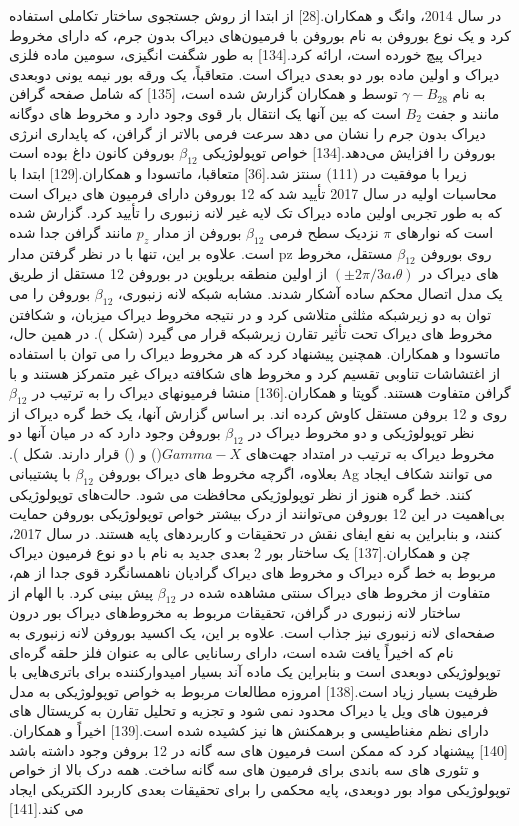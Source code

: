در سال 2014، وانگ و همکاران.[28] از ابتدا از روش جستجوی ساختار تکاملی استفاده کرد و یک نوع بوروفن به نام  بوروفن با فرمیون‌های دیراک بدون جرم، که دارای مخروط دیراک پیچ خورده است، ارائه کرد.[134] به طور شگفت انگیزی،  سومین ماده فلزی دیراک و اولین ماده بور دو بعدی دیراک است. متعاقباً، یک ورقه بور نیمه یونی دوبعدی به نام $\gamma-B_28$ توسط  و همکاران گزارش شده است، [135] که شامل صفحه گرافن مانند و جفت $B_2$ است که بین آنها یک انتقال بار قوی وجود دارد و مخروط های دوگانه دیراک بدون جرم را نشان می دهد سرعت فرمی بالاتر از گرافن، که پایداری انرژی بوروفن  را افزایش می‌دهد.[134] خواص توپولوژیکی $\beta_{12}$ بوروفن کانون داغ بوده است زیرا با موفقیت در  (111) سنتز شد.[36] متعاقبا، ماتسودا و همکاران.[129] ابتدا با محاسبات اولیه در سال 2017 تأیید شد که 12 بوروفن دارای فرمیون های دیراک است که به طور تجربی اولین ماده دیراک تک لایه غیر لانه زنبوری را تأیید کرد. گزارش شده است که نوارهای $\pi$ نزدیک سطح فرمی $\beta_{12}$ بوروفن از مدار $p_z$ مانند گرافن جدا شده است. علاوه بر این، تنها با در نظر گرفتن مدار pz روی بوروفن $\beta_{12}$ مستقل، مخروط های دیراک در $(±2\pi/3a، \theta)$ از اولین منطقه بریلوین  در بوروفن 12 مستقل از طریق یک مدل اتصال محکم ساده آشکار شدند. مشابه شبکه لانه زنبوری، $\beta_{12}$ بوروفن را می توان به دو زیرشبکه مثلثی متلاشی کرد و در نتیجه مخروط دیراک میزبان، و شکافتن مخروط های دیراک تحت تأثیر تقارن زیرشبکه قرار می گیرد (شکل ). در همین حال، ماتسودا و همکاران. همچنین پیشنهاد کرد که هر مخروط دیراک را می توان با استفاده از اغتشاشات تناوبی تقسیم کرد و مخروط های شکافته دیراک غیر متمرکز هستند و با گرافن متفاوت هستند. گوپتا و همکاران.[136] منشا فرمیونهای دیراک را به ترتیب در $\beta_{12}$ روی  و 12 بروفن مستقل کاوش کرده اند. بر اساس گزارش آنها، یک خط گره دیراک از نظر توپولوژیکی و دو مخروط دیراک در $\beta_{12}$ بوروفن وجود دارد که در میان آنها دو مخروط دیراک به ترتیب در امتداد جهت‌های $Gamma-X$() و  () قرار دارند. شکل ). بعلاوه، اگرچه مخروط های دیراک بوروفن $\beta_{12}$ با پشتیبانی Ag می توانند شکاف ایجاد کنند. خط گره هنوز از نظر توپولوژیکی محافظت می شود. حالت‌های توپولوژیکی بی‌اهمیت در این 12 بوروفن می‌توانند از درک بیشتر خواص توپولوژیکی بوروفن حمایت کنند، و بنابراین به نفع ایفای نقش در تحقیقات و کاربردهای پایه هستند. در سال 2017، چن و همکاران.[137] یک ساختار بور 2 بعدی جدید به نام  با دو نوع فرمیون دیراک مربوط به خط گره دیراک و مخروط های دیراک گرادیان ناهمسانگرد قوی جدا از هم، متفاوت از مخروط های دیراک سنتی مشاهده شده در $\beta_{12}$ پیش بینی کرد. با الهام از ساختار لانه زنبوری در گرافن، تحقیقات مربوط به مخروط‌های دیراک بور درون صفحه‌ای لانه زنبوری نیز جذاب است. علاوه بر این، یک اکسید بوروفن لانه زنبوری به نام  که اخیراً یافت شده است، دارای رسانایی عالی به عنوان فلز حلقه گره‌ای توپولوژیکی دوبعدی است و بنابراین یک ماده آند بسیار امیدوارکننده برای باتری‌هایی با ظرفیت بسیار زیاد است.[138] امروزه مطالعات مربوط به خواص توپولوژیکی به مدل فرمیون های ویل یا دیراک محدود نمی شود و تجزیه و تحلیل تقارن به کریستال های دارای نظم مغناطیسی و برهمکنش ها نیز کشیده شده است.[139] اخیراً  و همکاران.[140] پیشنهاد کرد که ممکن است فرمیون های سه گانه در 12 بروفن وجود داشته باشد و تئوری های سه باندی برای فرمیون های سه گانه ساخت. همه درک بالا از خواص توپولوژیکی مواد بور دوبعدی، پایه محکمی را برای تحقیقات بعدی کاربرد الکتریکی ایجاد می کند.[141]
